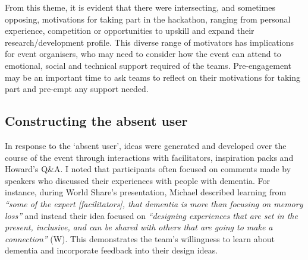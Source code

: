 From this theme, it is evident that there were intersecting, and sometimes opposing, motivations for taking part in the hackathon, ranging from personal experience, competition or opportunities to upskill and expand their research/development profile. This diverse range of motivators has implications for event organisers, who may need to consider how the event can attend to emotional, social and technical support required of the teams. Pre-engagement may be an important time to ask teams to reflect on their motivations for taking part and pre-empt any support needed. 


\subsection{Constructing the absent user}
\label{ThemeTwo:AbsentUser}
In response to the `absent user', ideas were generated and developed over the course of the event through interactions with facilitators, inspiration packs and Howard’s Q\&A. I noted that participants often focused on comments made by speakers who discussed their experiences with people with dementia. For instance, during World Share’s presentation, Michael described learning from \textit{``some of the expert [facilitators], that dementia is more than focusing on memory loss''} and instead their idea focused on \textit{``designing experiences that are set in the present, inclusive, and can be shared with others that are going to make a connection''} (W). This demonstrates the team’s willingness to learn about dementia and incorporate feedback into their design ideas.

